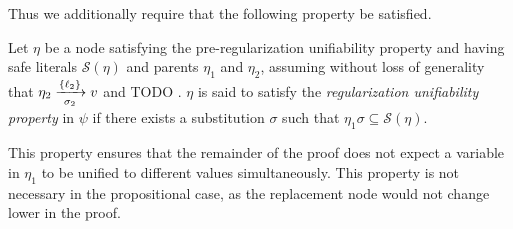 
\noindent
Thus we additionally require that the following property be satisfied.
\begin{definition}
\label{prop:extracheck}
Let $\eta$ be a node satisfying the pre-regularization unifiability property and having safe literals $\mathcal{S}(\eta)$ and parents $\eta_1$ and $\eta_2$, assuming without loss of generality that
$\eta_2 \xrightarrow[\sigma_2]{\{\ell_2\} } v$ and TODO  
. $\eta$ is said to satisfy the \emph{regularization unifiability property} in $\psi$ if there exists a substitution $\sigma$ such that $\eta_1\sigma \subseteq \mathcal{S}(\eta)$.
\end{definition}
This property ensures that the remainder of the proof does not expect a variable in $\eta_1$ to be unified to different values simultaneously. This property is not necessary in the propositional case, as the replacement node would not change lower in the proof. 





